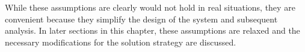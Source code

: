 While these assumptions are clearly would not hold in real situations, they are convenient because they simplify the design of the system and subsequent analysis. In later sections in this chapter, these assumptions are relaxed and the necessary modifications for the solution strategy are discussed. 
